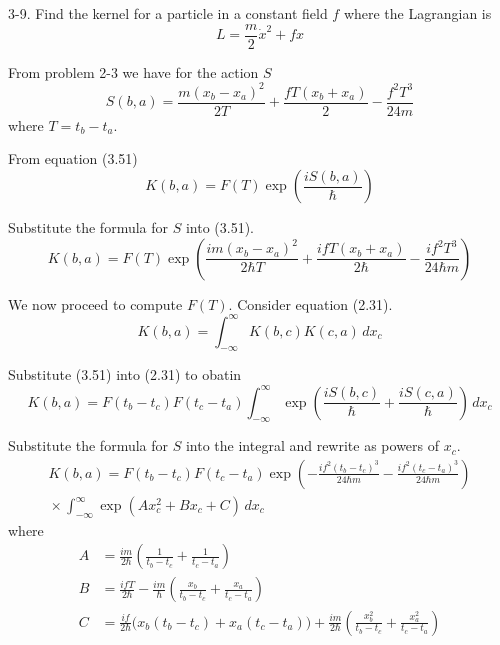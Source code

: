 \documentclass[12pt]{article}
\begin{document}
3-9.
Find the kernel for a particle in a constant field $f$
where the Lagrangian is
\begin{equation*}
L=\frac{m}{2}\dot x^2+fx
\end{equation*}

From problem 2-3 we have for the action $S$
\begin{equation*}
S(b,a)=\frac{m(x_b-x_a)^2}{2T}+\frac{fT(x_b+x_a)}{2}-\frac{f^2T^3}{24m}
\end{equation*}
where $T=t_b-t_a$.

\bigskip
From equation (3.51)
\begin{equation*}
K(b,a)=F(T)\exp\left(\frac{iS(b,a)}{\hbar}\right)
\tag{3.51}
\end{equation*}

Substitute the formula for $S$ into (3.51).
\begin{equation*}
K(b,a)=
F(T)\exp\left(
\frac{im(x_b-x_a)^2}{2\hbar T}
+\frac{ifT(x_b+x_a)}{2\hbar}
-\frac{if^2T^3}{24\hbar m}
\right)
\tag{1}
\end{equation*}

We now proceed to compute $F(T)$.
Consider equation (2.31).
\begin{equation*}
K(b,a)=\int_{-\infty}^\infty K(b,c)K(c,a)\,dx_c
\tag{2.31}
\end{equation*}

Substitute (3.51) into (2.31) to obatin
\begin{equation*}
K(b,a)=F(t_b-t_c)F(t_c-t_a)\int_{-\infty}^\infty
\exp\left(\frac{iS(b,c)}{\hbar}+\frac{iS(c,a)}{\hbar}\right)
\,dx_c
\end{equation*}

Substitute the formula for $S$ into the integral
and rewrite as powers of $x_c$.
\begin{multline*}
K(b,a)=F(t_b-t_c)F(t_c-t_a)
\exp\left(-\frac{if^2(t_b-t_c)^3}{24\hbar m}-\frac{if^2(t_c-t_a)^3}{24\hbar m}\right)
\\[1ex]
{}\times
\int_{-\infty}^\infty
\exp\left(Ax_c^2+Bx_c+C\right)
\,dx_c
\tag{2}
\end{multline*}
where
\begin{align*}
A&=\frac{im}{2\hbar}\left(\frac{1}{t_b-t_c}+\frac{1}{t_c-t_a}\right)
\tag{3}
\\
B&=\frac{ifT}{2\hbar}-\frac{im}{\hbar}\left(\frac{x_b}{t_b-t_c}+\frac{x_a}{t_c-t_a}\right)
\tag{4}
\\
C&=\frac{if}{2\hbar}\big(x_b(t_b-t_c)+x_a(t_c-t_a)\big)+\frac{im}{2\hbar}
\left(\frac{x_b^2}{t_b-t_c}+\frac{x_a^2}{t_c-t_a}\right)
\tag{5}
\end{align*}
\end{document}
